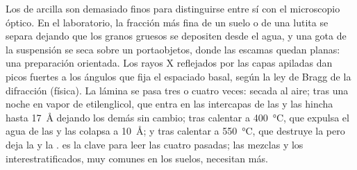 \begin{inthelab}
Los  de arcilla son demasiado finos para distinguirse entre sí con el microscopio óptico. En el laboratorio, la fracción más fina de
un suelo o de una lutita se separa dejando que los granos gruesos se depositen desde el agua, y una gota de la suspensión se seca sobre un
portaobjetos, donde las escamas quedan planas: una preparación orientada. Los rayos X reflejados por las capas apiladas dan picos fuertes a los
ángulos que fija el espaciado basal, según la ley de Bragg de la difracción (física). La lámina se pasa tres o cuatro veces: secada al aire;
tras una noche en vapor de etilenglicol, que entra en las intercapas de las  y las hincha hasta \SI{17}{\angstrom} dejando los demás
 sin cambio; tras calentar a \SI{400}{\celsius}, que expulsa el agua de las  y las colapsa a \SI{10}{\angstrom}; y tras
calentar a \SI{550}{\celsius}, que destruye la  pero deja la  y la .  es la clave para
leer las cuatro pasadas; las mezclas y los  interestratificados, muy comunes en los suelos, necesitan más.
\end{inthelab}

